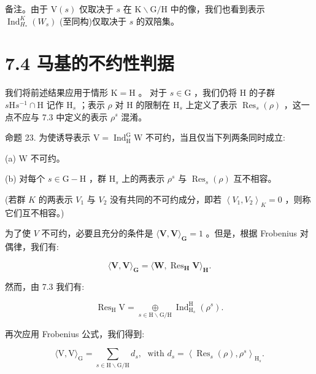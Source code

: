 \documentclass[10pt]{article}
\begin{document}
备注。由于 \(\mathrm{V}\left( s\right)\) 仅取决于 \(s\) 在 \(\mathrm{K} \smallsetminus  \mathrm{G}/\mathrm{H}\) 中的像，我们也看到表示 \({\operatorname{Ind}}_{{H}_{ * }}^{K}\left( {W}_{s}\right)\) (至同构)仅取决于 \(s\) 的双陪集。

\section*{7.4 马基的不约性判据}

我们将前述结果应用于情形 \(\mathrm{K} = \mathrm{H}\) 。 对于 \(s \in  \mathrm{G}\) ，我们仍将 \(\mathrm{H}\) 的子群 \(s\mathrm{H}{s}^{-1} \cap  \mathrm{H}\) 记作 \({\mathrm{H}}_{s}\) ；表示 \(\rho\) 对 \(\mathrm{H}\) 的限制在 \({\mathrm{H}}_{s}\) 上定义了表示 \({\operatorname{Res}}_{s}\left( \rho \right)\) ，这一点不应与 7.3 中定义的表示 \({\rho }^{s}\) 混淆。

命题 23. 为使诱导表示 \(\mathrm{V} = {\operatorname{Ind}}_{\mathrm{H}}^{\mathrm{G}}\mathrm{W}\) 不可约，当且仅当下列两条同时成立:

(a) \(\mathrm{W}\) 不可约。

(b) 对每个 \(s \in  \mathrm{G} - \mathrm{H}\) ，群 \({\mathrm{H}}_{s}\) 上的两表示 \({\rho }^{s}\) 与 \({\operatorname{Res}}_{s}\left( \rho \right)\) 互不相容。

(若群 \(K\) 的两表示 \({V}_{1}\) 与 \({V}_{2}\) 没有共同的不可约成分，即若 \({\left\langle  {V}_{1},{V}_{2}\right\rangle  }_{K} = 0\) ，则称它们互不相容。)

为了使 \(V\) 不可约，必要且充分的条件是 \(\langle \mathbf{V},\mathbf{V}{\rangle }_{\mathbf{G}} = 1\) 。但是，根据 Frobenius 对偶律，我们有:

\[
\langle \mathbf{V},\mathbf{V}{\rangle }_{\mathbf{G}} = \langle \mathbf{W},{\operatorname{Res}}_{\mathbf{H}}\mathbf{V}{\rangle }_{\mathbf{H}}.
\]

然而，由 7.3 我们有:

\[
{\operatorname{Res}}_{\mathrm{H}}\mathrm{V} = \mathop{\oplus }\limits_{{s \in  \mathrm{H} \smallsetminus  \mathrm{G}/\mathrm{H}}}{\operatorname{Ind}}_{{\mathrm{H}}_{s}}^{\mathrm{H}}\left( {\rho }^{s}\right) .
\]

再次应用 Frobenius 公式，我们得到:

\[
\langle \mathrm{V},\mathrm{V}{\rangle }_{\mathrm{G}} = \mathop{\sum }\limits_{{s \in  \mathrm{H} \smallsetminus  \mathrm{G}/\mathrm{H}}}{d}_{s},\;\text{ with }{d}_{s} = {\left\langle  {\operatorname{Res}}_{s}\left( \rho \right) ,{\rho }^{s}\right\rangle  }_{{\mathrm{H}}_{s}}.
\]
\end{document}
